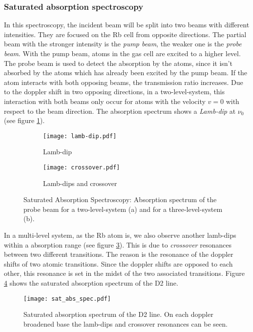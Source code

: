 \subsubsection{Saturated absorption spectroscopy}
In this spectroscopy, the incident beam will be split into two beams with different intensities. They are focused on the Rb cell from opposite directions. The partial beam with the stronger intensity is the \emph{pump beam}, the weaker one is the \emph{probe beam}. With the pump beam, atoms in the gas cell are excited to a higher level. The probe beam is used to detect the absorption by the atoms, since it isn't absorbed by the atoms which has already been excited by the pump beam. If the atom interacts with both opposing beams, the transmission ratio increases. Due to the doppler shift in two opposing directions, in a two-level-system, this interaction with both beams only occur for atoms with the velocity $v=0$ with respect to the beam direction. The absorption spectrum shows a \emph{Lamb-dip} at $\nu_0$ (see figure \ref{fig:lamb-dip}).
\begin{figure}[h]
	\centering
	\begin{subfigure}{0.45\textwidth}
		\centering
		\texttt{[image: lamb-dip.pdf]}
		\caption{Lamb-dip}
		\label{fig:lamb-dip}
	\end{subfigure}
	\hfill
	\begin{subfigure}{0.45\textwidth}
		\centering
		\texttt{[image: crossover.pdf]}
		\caption{Lamb-dips and crossover}
		\label{fig:crossover}
	\end{subfigure}
	\caption[Saturated Absorption Spectroscopy]{Saturated Absorption Spectroscopy: Absorption spectrum of the probe beam for a two-level-system (a) and for a three-level-system (b).}
\end{figure}
In a multi-level system, as the Rb atom is, we also observe another lamb-dips within a absorption range (see figure \ref{fig:crossover}). This is due to \emph{crossover} resonances between two different transitions. The reason is the resonance of the doppler shifts of two atomic transitions. Since the doppler shifts are opposed to each other, this resonance is set in the midst of the two associated transitions.
Figure \ref{fig:sat_abs_spec} shows the saturated absorption spectrum of the D2 line.
\begin{figure}[h]
	\centering
	\texttt{[image: sat\_abs\_spec.pdf]}
	\caption[Saturated absorption spectrum of the D2 line]{Saturated absorption spectrum of the D2 line. On each doppler broadened base the lamb-dips and crossover resonances can be seen. \cite{lit:AK_manual2012}}
	\label{fig:sat_abs_spec}
\end{figure}
